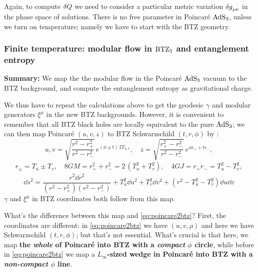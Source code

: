 \documentclass[11pt,a4paper,utf8]{article}
\begin{document}
	Again, to compute $\mathinner{\delta Q}$ we need to consider a particular metric variation $\mathinner{\delta g}_{\mu\nu}$ in the phase space of solutions. There is no free parameter in Poincar\'e $\mathrm{AdS}_3$, unless we turn on temperature; namely we have to start with the BTZ geometry. 
	
\subsubsection{Finite temperature: modular flow in $\mathrm{BTZ}_3$ and entanglement entropy}
\textbf{Summary:} We map the the modular flow in the Poincar\'e $\mathrm{AdS}_3$ vacuum to the BTZ background, and compute the entanglement entropy as gravitational charge. 

	We thus have to repeat the calculations above to get the geodesic $\gamma$ and modular generators $\xi^\mu$ in the new BTZ backgrounds. However, it is convenient to remember that all BTZ black holes are locally equivalent to the pure $\mathrm{AdS}_3$; we can then map Poincar\'e $(u,v,z)$ to BTZ Schwarzschild $(t,r,\phi)$ by \cite{Hubeny:2007xt}:
	\begin{equation}
		u,v = \sqrt{\frac{r^2 - r_+^2}{r^2 - r_-^2}}\,
			e^{(\phi\pm t)\,2T_{u,v}},
	\quad
		z = \sqrt{\frac{r_+^2 - r_-^2}{r^2 - r_-^2}}\,
			e^{\phi r_+ + t r_-},
	\end{equation}
	\begin{gather}
		r_\pm = T_u \pm T_v,
	\quad
		8GM = r_+^2 + r_-^2
		= 2\,(T_u^2 + T_v^2),
	\quad
		4GJ = r_+ r_-
		= T_u^2 - T_v^2,
	\end{gather}
	\begin{equation}
		\dd{s}^2
		= \frac{r^2 \dd{r}^2}{
				(r^2 - r_+^2)
				(r^2 - r_-^2)
			}
			+ T_u^2 \dd{u}^2
			+ T_v^2 \dd{v}^2
			+ (r^2 - T_u^2 - T_v^2) \dd{u} \dd{v}
	\end{equation}
	$\gamma$ and $\xi^\mu$ in BTZ coordinates both follow from this map. 
	
	What's the difference between this map and \eqref{eq:poincare2btz}? First, the coordinates are different: in \eqref{eq:poincare2btz} we have $(u,v,\rho)$ and here we have Schwarzschild $(t,r,\phi)$; but that's not essential. What's crucial is that here, we map \textbf{the \textsl{whole} of Poincar\'e into BTZ with a \textsl{compact} $\phi$ circle}, while before in \eqref{eq:poincare2btz} we map a \textbf{$L_\infty$-sized wedge in Poincar\'e into BTZ with a \textsl{non-compact} $\phi$ line}. 
	
\end{document}
